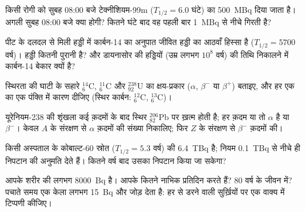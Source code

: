 \begin{exercise}[$\star\star$]\label{exo:g11:nucleus-radioactivity:9}
किसी रोगी को सुबह 08:00 बजे टेक्नीशियम-99m ($T_{1/2} = 6.0$ घंटे) का \qty{500}{MBq} दिया
जाता है। अगली सुबह 08:00 बजे  क्या होगी? कितने घंटे बाद वह
पहली बार \qty{1}{MBq} से नीचे गिरती है?
\end{exercise}

\begin{exercise}[$\star\star$]\label{exo:g11:nucleus-radioactivity:10}
पीट के दलदल से मिली हड्डी में कार्बन-14 का अनुपात जीवित हड्डी का आठवाँ हिस्सा
है ($T_{1/2} = \num{5700}$ वर्ष)। हड्डी कितनी पुरानी है? और डायनासोर की हड्डियों (उम्र लगभग
$10^{8}$ वर्ष) की तिथि निकालने में कार्बन-14 बेकार क्यों है?
\end{exercise}

\begin{exercise}[$\star\star$]\label{exo:g11:nucleus-radioactivity:11}
स्थिरता की घाटी के सहारे ${}^{14}_{6}\mathrm{C}$, ${}^{11}_{6}\mathrm{C}$ और ${}^{238}_{92}\mathrm{U}$ का क्षय-प्रकार ($\alpha$,
$\beta^-$ या $\beta^+$) बताइए, और हर एक का एक पंक्ति में कारण दीजिए (स्थिर
कार्बन: ${}^{12}_{6}\mathrm{C}$, ${}^{13}_{6}\mathrm{C}$)।
\end{exercise}

\begin{exercise}[$\star\star\star$]\label{exo:g11:nucleus-radioactivity:12}
यूरेनियम-238 की शृंखला कई क़दमों के बाद स्थिर ${}^{206}_{82}\mathrm{Pb}$ पर ख़त्म होती है; हर
क़दम या तो $\alpha$ है या $\beta^-$। केवल $A$ के संरक्षण से $\alpha$ क़दमों
की संख्या निकालिए; फिर $Z$ के संरक्षण से $\beta^-$ क़दमों की।
\end{exercise}

\begin{exercise}[$\star\star\star$]\label{exo:g11:nucleus-radioactivity:13}
किसी अस्पताल के कोबाल्ट-60 स्रोत ($T_{1/2} = 5.3$ वर्ष) की  \qty{6.4}{TBq}
है; नियम \qty{0.1}{TBq} से नीचे ही निपटान की अनुमति देते हैं। कितने वर्ष बाद उसका
निपटान किया जा सकेगा?
\end{exercise}

\begin{exercise}[$\star\star\star$]\label{exo:g11:nucleus-radioactivity:14}
आपके शरीर की  लगभग \qty{8000}{Bq} है। आपके कितने नाभिक प्रतिदिन
 करते हैं? $80$ वर्ष के जीवन में? पचाते समय एक केला लगभग \qty{15}{Bq} और
जोड़ देता है: हर  से डरने वाली सुर्ख़ियों पर एक वाक्य में
टिप्पणी कीजिए।
\end{exercise}


